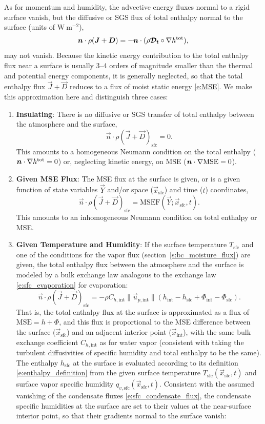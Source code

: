 \documentclass{report}
\begin{document}
As for momentum and humidity, the advective energy fluxes normal to a rigid surface vanish, but the diffusive or SGS flux of total enthalpy normal to the surface (units of $\mathrm{W~m^{-2}}$),
\[
\boldsymbol{{n}} \cdot \rho (\boldsymbol{{J}} + \boldsymbol{{D}}) = -\boldsymbol{{n}} \cdot (\rho \boldsymbol{{\mathcal{D}_t}} \circ \nabla h^{\mathrm{tot}}),
\]
may not vanish. Because the kinetic energy contribution to the total enthalpy flux near a surface is usually 3--4 orders of magnitude smaller than the thermal and potential energy components, it is generally neglected, so that the total enthalpy flux $\vec{J} + \vec{D}$ reduces to a flux of moist static energy \eqref{e:MSE}. We make this approximation here and distinguish three cases:
\begin{enumerate}
    \item \textbf{Insulating}: There is no diffusive or SGS transfer of total enthalpy between the atmosphere and the surface,
    \[
    \vec{n} \cdot \rho (\vec{J} + \vec{D})_\mathrm{sfc} = 0.
    \]
    This amounts to a homogeneous Neumann condition on the total enthalpy ($\boldsymbol{{n}} \cdot \nabla h^\mathrm{tot}=0$) or, neglecting kinetic energy, on MSE ($\boldsymbol{{n}} \cdot \nabla \mathrm{MSE} =0$).
    \item \textbf{Given MSE Flux}: The MSE flux at the surface is given, or is a given function of state variables $\vec{Y}$ and/or space ($\vec{x}_\mathrm{sfc}$) and time ($t$) coordinates,
    \[
    \vec{n} \cdot \rho (\vec{J} + \vec{D})_\mathrm{sfc} = \mathrm{MSEF}(\vec{Y}; \vec{x}_\mathrm{sfc}, t).
    \]
    This amounts to an inhomogeneous Neumann condition on total enthalpy or MSE.
    \item \textbf{Given Temperature and Humidity}: If the surface temperature $T_\mathrm{sfc}$ and one of the conditions for the vapor flux (section~\ref{s:bc_moisture_flux}) are given, the total enthalpy flux between the atmosphere and the surface is modeled by a bulk exchange law analogous to the exchange law \eqref{e:sfc_evaporation} for evaporation:
    \begin{equation}\label{e:sfc_energy_flux}
    \vec{n} \cdot \rho (\vec{J} + \vec{D})_\mathrm{sfc} = -\rho C_{h, \mathrm{int}} \| \vec{u}_{p,\mathrm{int}} \| 
     \left( h_\mathrm{int} -h_\mathrm{sfc} + \Phi_\mathrm{int} -  \Phi_\mathrm{sfc} \right).
    \end{equation}
    That is, the total enthalpy flux at the surface is approximated as a flux of $\mathrm{MSE} =h + \Phi$, and this flux is proportional to the MSE difference between the surface ($\vec{x}_\mathrm{sfc}$) and an adjacent interior point ($\vec{x}_\mathrm{int}$), with the same bulk exchange coefficient $C_{h, \mathrm{int}}$ as for water vapor (consistent with taking the turbulent diffusivities of specific humidity and total enthalpy to be the same). The enthalpy $h_\mathrm{sfc}$ at the surface is evaluated according to its definition \eqref{e:enthalpy_definition} from the given surface temperature $T_\mathrm{sfc}(\vec{x}_\mathrm{sfc}, t)$ and surface vapor specific humidity $q_{v, \mathrm{sfc}}(\vec{x}_\mathrm{sfc}, t)$. Consistent with the assumed vanishing of the condensate fluxes \eqref{e:sfc_condensate_flux}, the condensate specific humidities at the surface are set to their values at the near-surface interior point, so that their gradients normal to the surface vanish:

\end{enumerate}
\end{document}
